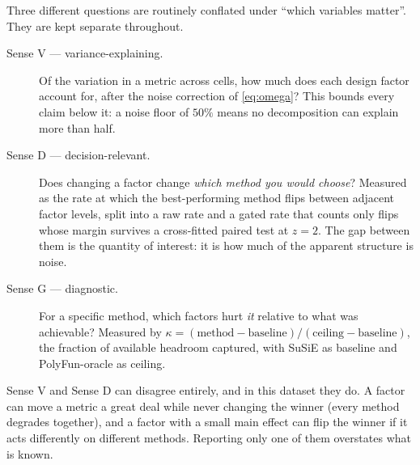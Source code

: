 Three different questions are routinely conflated under ``which variables
matter''. They are kept separate throughout.

\begin{description}
\item[Sense V --- variance-explaining.] Of the variation in a metric across
cells, how much does each design factor account for, after the noise
correction of \eqref{eq:omega}? This bounds every claim below it: a noise floor
of $50\%$ means no decomposition can explain more than half.
\item[Sense D --- decision-relevant.] Does changing a factor change
\emph{which method you would choose}? Measured as the rate at which the
best-performing method flips between adjacent factor levels, split into a raw
rate and a gated rate that counts only flips whose margin survives a
cross-fitted paired test at $z=2$. The gap between them is the quantity of
interest: it is how much of the apparent structure is noise.
\item[Sense G --- diagnostic.] For a specific method, which factors hurt
\emph{it} relative to what was achievable? Measured by
$\kappa=(\text{method}-\text{baseline})/(\text{ceiling}-\text{baseline})$, the
fraction of available headroom captured, with SuSiE as baseline and
PolyFun-oracle as ceiling.
\end{description}

Sense V and Sense D can disagree entirely, and in this dataset they do. A factor
can move a metric a great deal while never changing the winner (every method
degrades together), and a factor with a small main effect can flip the winner
if it acts differently on different methods. Reporting only one of them
overstates what is known.

